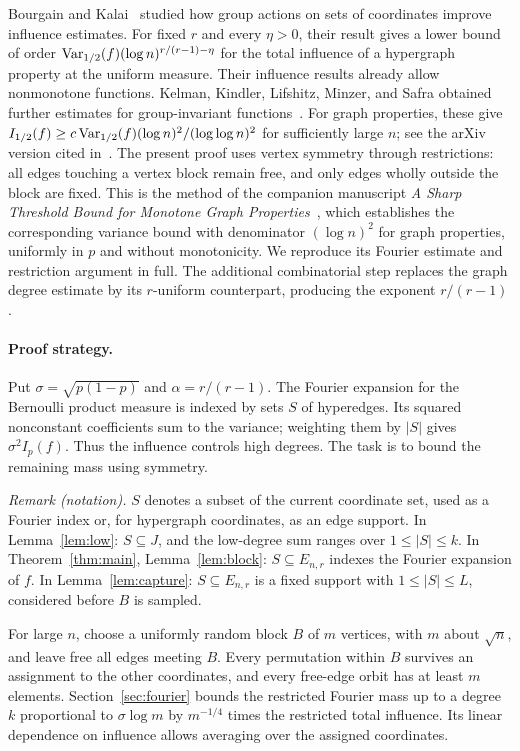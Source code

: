 Bourgain and Kalai~\cite[Corollary~4.1]{BK97} studied how group
actions on sets of coordinates improve influence estimates.
For fixed $r$ and every $\eta>0$, their result gives a lower bound
of order $\operatorname{Var}_{1/2}(f)(\log n)^{r/(r-1)-\eta}$ for the total
influence of a hypergraph property at the uniform measure.
Their influence results already allow nonmonotone functions.
Kelman, Kindler, Lifshitz, Minzer, and Safra obtained further
estimates for group-invariant functions~\cite{KKLMS20}.
For graph properties, these give
$I_{1/2}(f)\ge c\operatorname{Var}_{1/2}(f)(\log n)^2/(\log\log n)^2$
for sufficiently large $n$; see the arXiv version cited
in~\cite[Section~7.4]{KKLMS20}.
The present proof uses vertex symmetry through restrictions: all
edges touching a vertex block remain free, and only edges wholly
outside the block are fixed. This is the method of the companion
manuscript \emph{A Sharp Threshold Bound for Monotone Graph
Properties}~\cite[Theorem~1.2 and Sections~2--3]{Graph2026}, which establishes
the corresponding variance bound with denominator $(\log n)^2$
for graph properties, uniformly in $p$ and without monotonicity.
We reproduce its Fourier estimate and restriction argument in full.
The additional combinatorial step replaces the graph degree estimate
by its $r$-uniform counterpart, producing the exponent $r/(r-1)$.

\paragraph{Proof strategy.}
Put $\sigma=\sqrt{p(1-p)}$ and $\alpha=r/(r-1)$.
The Fourier expansion for the Bernoulli product measure is indexed by
sets $S$ of hyperedges. Its squared nonconstant coefficients sum to
the variance; weighting them by $|S|$ gives $\sigma^2I_p(f)$.
Thus the influence controls high degrees. The task is to bound the
remaining mass using symmetry.

\noindent\textit{Remark (notation).} $S$ denotes a subset of the current coordinate set, used as a Fourier index or, for hypergraph coordinates, as an edge support. In Lemma~\ref{lem:low}: $S\subseteq J$, and the low-degree sum ranges over $1\le|S|\le k$. In Theorem~\ref{thm:main}, Lemma~\ref{lem:block}: $S\subseteq E_{n,r}$ indexes the Fourier expansion of $f$. In Lemma~\ref{lem:capture}: $S\subseteq E_{n,r}$ is a fixed support with $1\le|S|\le L$, considered before $B$ is sampled.


For large $n$, choose a uniformly random block $B$ of $m$ vertices,
with $m$ about $\sqrt n$, and leave free all edges meeting $B$.
Every permutation within $B$ survives an assignment to the other
coordinates, and every free-edge orbit has at least $m$ elements.
Section~\ref{sec:fourier} bounds the restricted Fourier mass up to
a degree $k$ proportional to $\sigma\log m$ by $m^{-1/4}$ times
the restricted total influence. Its linear dependence on influence
allows averaging over the assigned coordinates.


